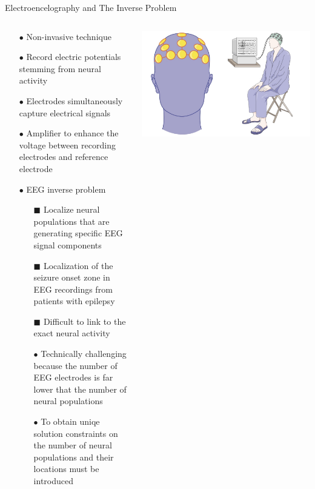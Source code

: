 \documentclass[aspectratio=169, 9pt]{beamer}
\begin{document}
\begin{frame}{Electroencelography and The Inverse Problem}
  \begin{columns}
    \begin{column}{0.5\textwidth}
      \begin{itemize}
        \item[$\bullet$] Non-invasive technique
        \item[$\bullet$] Record electric potentials stemming from neural activity 
        \item[$\bullet$] Electrodes simultaneously capture electrical signals 
        \item[$\bullet$] Amplifier to enhance the voltage between recording electrodes and reference electrode
        \item[$\bullet$] EEG inverse problem
        \begin{itemize}
          \item[\tiny$\blacksquare$] Localize neural populations that are generating specific EEG signal components
          \item[\tiny$\blacksquare$] Localization of the seizure onset zone in EEG recordings from patients with epilepsy
          
          \item[\tiny$\blacksquare$] Difficult to link to the exact neural activity
          \item[$\bullet$] Technically challenging because the number of EEG electrodes is far lower that the number of neural populations
          \item[$\bullet$] To obtain uniqe solution constraints on the number of neural populations and their locations must be introduced
        \end{itemize}
      \end{itemize}
    \end{column}
    \begin{column}{0.5\textwidth}
      \includegraphics[width=1\textwidth]{figures/new_eeg_wiki.jpg}
    \end{column}
  \end{columns}
\end{frame}
\end{document}
